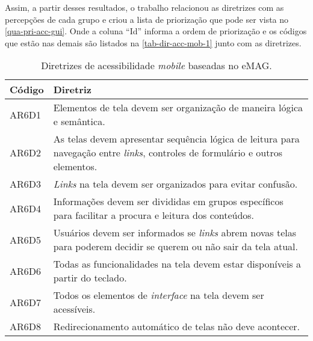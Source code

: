 Assim, a partir desses resultados, o trabalho relacionou as diretrizes com as percepções de cada grupo
e criou a lista de priorização que pode ser vista no \autoref{qua-pri-acc-gui}.
Onde a coluna ``Id'' informa a ordem de priorização e os códigos que estão nas demais são listados na \autoref{tab-dir-acc-mob-1} junto com as diretrizes.

\begin{table}[htb]
  \begin{center}
    \ABNTEXfontereduzida
    \caption{Diretrizes de acessibilidade \emph{mobile} baseadas no eMAG.}
    \label{tab-dir-acc-mob-1}
    \begin{tabular}{p{1.2cm}|p{13.5cm}}
      \textbf{Código} & \textbf{Diretriz}                                                                                                                            \\
      \hline
      AR6D1           & Elementos de tela devem ser organização de maneira lógica e semântica.                                                                       \\
      \hline
      AR6D2           & As telas devem apresentar sequência lógica de leitura para navegação entre \emph{links}, controles de formulário e outros elementos.         \\
      \hline
      AR6D3           & \emph{Links} na tela devem ser organizados para evitar confusão.                                                                             \\
      \hline
      AR6D4           & Informações devem ser divididas em grupos específicos para facilitar a procura e leitura dos conteúdos.                                      \\
      \hline
      AR6D5           & Usuários devem ser informados se \emph{links} abrem novas telas para poderem decidir se querem ou não sair da tela atual.                    \\
      \hline
      AR6D6           & Todas as funcionalidades na tela devem estar disponíveis a partir do teclado.                                                                \\
      \hline
      AR6D7           & Todos os elementos de \emph{interface} na tela devem ser acessíveis.                                                                         \\
      \hline
      AR6D8           & Redirecionamento automático de telas não deve acontecer.                                                                                     \\

\end{tabular}
\end{center}
\end{table}
